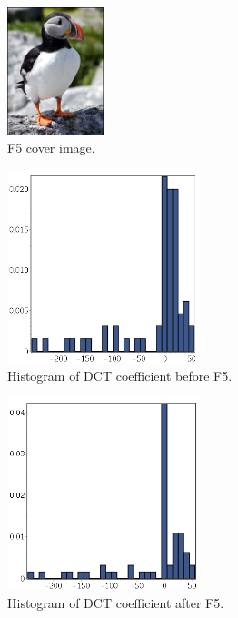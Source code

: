 \begin{figure}
	\centering
	\includegraphics[width=0.25\textwidth]{figures/puffin.jpg}
	\caption{F5 cover image.}
	\label{fig:puffin}
\end{figure}

\begin{figure}
	\centering
	\includegraphics[width=0.5\textwidth]{figures/inputF5.png}
	\caption{Histogram of DCT coefficient before F5.}
	\label{fig:InputF5}
\end{figure}

\begin{figure}
	\centering
	\includegraphics[width=0.5\textwidth]{figures/outputF5.png}
	\caption{Histogram of DCT coefficient after F5.}
	\label{fig:outputF5}
\end{figure}

